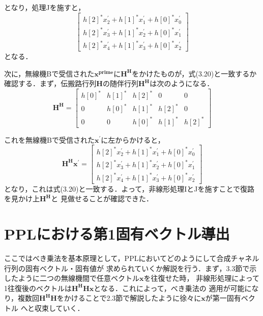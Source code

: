 となり，処理Jを施すと，
\begin{equation}
    \left[
        \begin{array}{c}
            h[2]^*x_2^{\prime}+h[1]^*x_1^{\prime}+h[0]^*x_0^{\prime} \\
            h[2]^*x_3^{\prime}+h[1]^*x_2^{\prime}+h[0]^*x_1^{\prime} \\
            h[2]^*x_4^{\prime}+h[1]^*x_3^{\prime}+h[0]^*x_2^{\prime}
        \end{array}
    \right]
\end{equation}
となる．

次に，無線機Bで受信された$\bm{x^{prime}}$に$\bm{H^H}$をかけたものが，式(3.20)と一致するか
確認する．まず，伝搬路行列$\bm{H}$の随伴行列$\bm{H^H}$は次のようになる．
\begin{equation}
    \bm{H^H} = \left[
        \begin{array}{ccccc}
            h[0]^* & h[1]^* & h[2]^* & 0 & 0 \\
            0 & h[0]^* & h[1]^* & h[2]^* & 0 \\
            0 & 0 & h[0]^* & h[1]^* & h[2]^*
        \end{array}
    \right]
\end{equation}

これを無線機Bで受信された$\bm{x^{\prime}}$に左からかけると，
\begin{equation}
    \bm{H^Hx^{\prime}} = \left[
        \begin{array}{c}
            h[2]^*x_2^{\prime}+h[1]^*x_1^{\prime}+h[0]^*x_0^{\prime} \\
            h[2]^*x_3^{\prime}+h[1]^*x_2^{\prime}+h[0]^*x_1^{\prime} \\
            h[2]^*x_4^{\prime}+h[1]^*x_3^{\prime}+h[0]^*x_2^{\prime}
        \end{array}
    \right]
\end{equation}
となり，これは式(3.20)と一致する．よって，非線形処理IとJを施すことで復路を見かけ上$\bm{H^H}$と
見做せることが確認できた．

\section{PPLにおける第1固有ベクトル導出}
ここではべき乗法を基本原理として，PPLにおいてどのようにして合成チャネル行列の固有ベクトル・固有値が
求められていくか解説を行う．まず，3.3節で示したように二つの無線機間で任意ベクトル$\bm{x}$を往復せた時，
非線形処理によって1往復後のベクトルは$\bm{H^HHx}$となる．これによって，べき乗法の
適用が可能になり，複数回$\bm{H^HH}$をかけることで2.3節で解説したように徐々に$\bm{x}$が第一固有ベクトル
へと収束していく．

